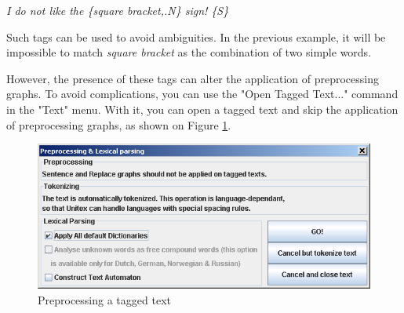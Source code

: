 \bigskip
\textit{I do not like the \{square bracket,.N\} sign! \{S\}}

\bigskip
\noindent Such tags can be used to avoid ambiguities. In the previous example,
it will be impossible to match \textit{square bracket} as the combination of two
simple words.

\bigskip
\noindent However, the presence of these tags can alter the application of
preprocessing graphs. To avoid complications, you can use the "Open Tagged
Text..." command in the "Text" menu. With it, you can open a tagged text and skip
the application of preprocessing graphs, as shown on Figure
\ref{preprocess-tagged-text}.

\bigskip
\begin{figure}[!ht]
\begin{center}
\includegraphics[width=14cm]{resources/img/fig2-15.png}
\caption{Preprocessing a tagged text\label{preprocess-tagged-text}}
\end{center}
\end{figure}
